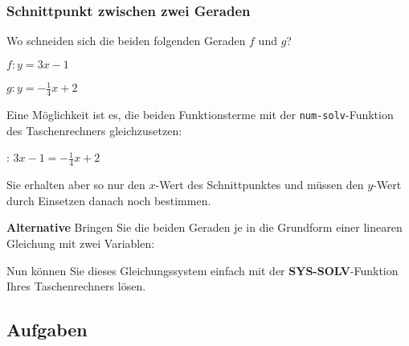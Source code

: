 \subsubsection{Schnittpunkt zwischen zwei Geraden}

Wo schneiden sich die beiden folgenden Geraden $f$ und $g$?

$f: y=3x - 1$

$g: y=-\frac14x +2$

Eine Möglichkeit ist es, die beiden Funktionsterme mit
der \texttt{num-solv}-Funktion des Taschenrechners gleichzusetzen:

: $3x-1 = -\frac14x+2$

Sie erhalten aber so nur den $x$-Wert des Schnittpunktes und müssen
den $y$-Wert durch Einsetzen danach noch bestimmen.


\textbf{Alternative}
Bringen Sie die beiden Geraden je in die Grundform einer linearen
Gleichung mit zwei Variablen:


Nun können Sie dieses Gleichungssystem einfach mit
der \textbf{SYS-SOLV}-Funktion Ihres Taschenrechners lösen.

\vspace{5mm}


\vspace{5mm}

\newpage

\subsection*{Aufgaben}

\newpage
